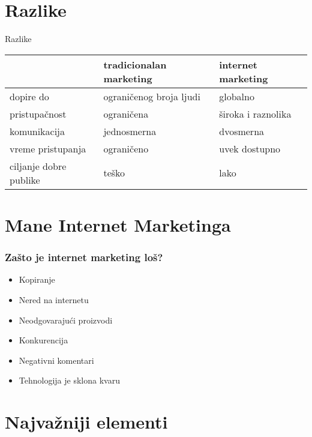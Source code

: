\documentclass{beamer}
\begin{document}
\section{Razlike}
\begin{frame}{Razlike}
\begin{center}
\begin{tabular}{|p{2cm}|p{3.1cm}|p{3.1cm}|} \hline
     &\centering tradicionalan marketing& internet marketing\\ \hline
 \centering dopire do& ograničenog broja \centering ljudi & globalno\\   \hline
\centering pristupačnost & ograničena& široka i raznolika\\ \hline
\centering komunikacija & jednosmerna& dvosmerna\\\hline
 \centering vreme pristupanja& ograničeno& uvek dostupno \\ \hline
\centering ciljanje dobre  publike &  teško &  lako  \\ \hline
\end{tabular}
\label{tab:tabela1}
\end{center}
\end{frame}


\section{Mane Internet Marketinga}

\begin{frame}[fragile]\frametitle{Zašto je internet marketing loš?}
	\begin{itemize}	
		\item  Kopiranje
		\item  Nered na internetu
		\item  Neodgovarajući proizvodi
		\item  Konkurencija
		\item  Negativni komentari
		\item  Tehnologija je sklona kvaru
	\end{itemize}
\end{frame}



\section{Najvažniji elementi}
\end{document}
